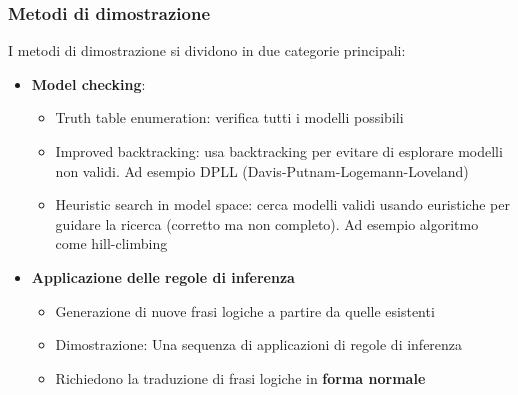 \documentclass[a4paper]{article}
\begin{document}
\subsubsection{Metodi di dimostrazione}
I metodi di dimostrazione si dividono in due categorie principali:
\begin{itemize}
  \item \textbf{Model checking}:
    \begin{itemize}
      \item Truth table enumeration: verifica tutti i modelli possibili
      \item Improved backtracking: usa backtracking per evitare di esplorare
        modelli non validi. Ad esempio DPLL (Davis-Putnam-Logemann-Loveland)
      \item Heuristic search in model space: cerca modelli validi usando
        euristiche per guidare la ricerca (corretto ma non completo). Ad esempio
        algoritmo come hill-climbing
    \end{itemize}

  \item \textbf{Applicazione delle regole di inferenza}
    \begin{itemize}
      \item Generazione di nuove frasi logiche a partire da quelle esistenti
      \item Dimostrazione: Una sequenza di applicazioni di regole di inferenza
      \item Richiedono la traduzione di frasi logiche in \textbf{forma normale}
    \end{itemize}
\end{itemize}
\end{document}
